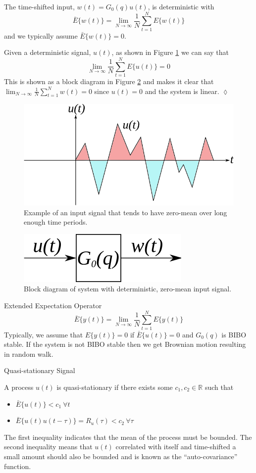 The time-shifted input, $w(t)=G_0(q)u(t)$, is deterministic with
$$\bar{E}\{w(t)\} = \lim_{N\to\infty}\frac{1}{N}\sum_{t=1}^NE\{w(t)\}$$
and we typically assume $\bar{E}\{w(t)\}=0$.

\begin{example}
Given a deterministic signal, $u(t)$, as shown in Figure \ref{fig:04inputSignal} we can say that
$$\lim_{N\to\infty}\frac{1}{N}\sum_{t=1}^NE\{u(t)\} = 0$$
This is shown as a block diagram in Figure \ref{fig:04detSignal} and makes it clear that $\lim_{N\to\infty}\frac{1}{N}\sum_{t=1}^Nw(t)=0$ since $u(t)=0$ and the system is linear.
$\lozenge$
\end{example}
\begin{figure}[ht!]
	\centering
	\includegraphics[width=.5\textwidth]{images/04inputSignal}
	\caption{Example of an input signal that tends to have zero-mean over long enough time periods.}
	\label{fig:04inputSignal}
\end{figure}

\begin{figure}[ht!]
	\centering
	\includegraphics[width=.3\textwidth]{images/04detSignal}
	\caption{Block diagram of system with deterministic, zero-mean input signal.}
	\label{fig:04detSignal}
\end{figure}

\begin{definition}{Extended Expectation Operator}
$$\bar{E}\{y(t)\}=\lim_{N\to\infty}\frac{1}{N}\sum_{t=1}^NE\{y(t)\}$$
Typically, we assume that $E\{y(t)\}=0$ if $\bar{E}\{u(t)\}=0$ and $G_0(q)$ is BIBO stable. If the system is not BIBO stable then we get Brownian motion resulting in random walk.
\end{definition}

\begin{definition}{Quasi-stationary Signal}

\label{def:quasistationary}
A process $u(t)$ is quasi-stationary if there exists some $c_1, c_2 \in\mathbb{R}$ such that
\begin{itemize}
\item $\bar{E}\{u(t)\} < c_1 ~\forall t$
\item $\bar{E}\{u(t)u(t-\tau)\} = R_u(\tau) < c_2 ~\forall \tau$
\end{itemize}
The first inequality indicates that the mean of the process must be bounded. The second inequality means that $u(t)$ correlated with itself and time-shifted a small amount should also be bounded and is known as the ``auto-covariance'' function.
\end{definition}

